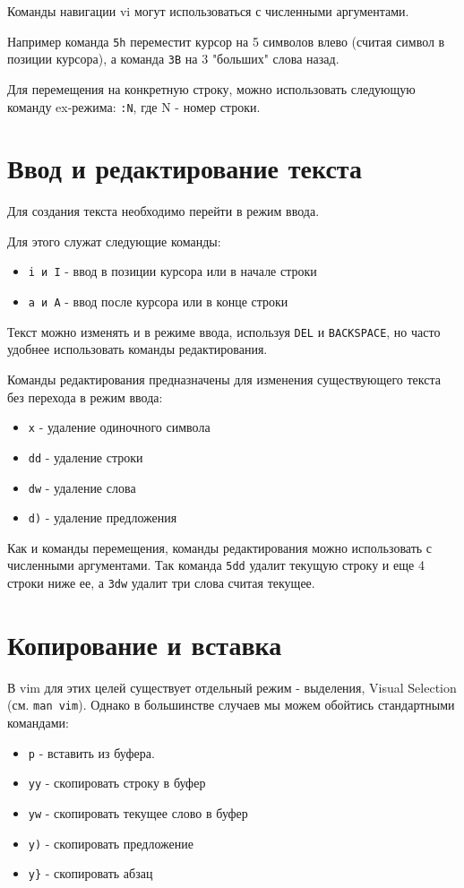 Команды навигации vi могут использоваться с численными аргументами.

Например команда \verb+5h+ переместит курсор на 5 символов влево (считая символ в позиции курсора), а команда \verb+3B+ на 3 "больших" слова назад. 

Для перемещения на конкретную строку, можно использовать следующую команду ex-режима: \verb+:N+, где N - номер строки.


\section{Ввод и редактирование текста}

Для создания текста необходимо перейти в режим ввода.

Для этого служат следующие команды:
\begin{itemize}
\item \verb+i и I+ - ввод в позиции курсора или в начале строки
\item \verb+a и A+ - ввод после курсора или в конце строки
\end{itemize}

Текст можно изменять и в режиме ввода, используя \verb+DEL+ и \verb+BACKSPACE+, но часто удобнее использовать команды редактирования.

Команды редактирования предназначены для изменения существующего текста без перехода в режим ввода:
\begin{itemize}
\item \verb+x+ - удаление одиночного символа
\item \verb+dd+ - удаление строки
\item \verb+dw+ - удаление слова
\item \verb+d)+ - удаление предложения
\end{itemize}

Как и команды перемещения, команды редактирования можно использовать с численными аргументами. Так команда \verb+5dd+ удалит текущую строку и еще 4 строки ниже ее, а \verb+3dw+ удалит три слова считая текущее.

\section{Копирование и вставка}

В vim для этих целей существует отдельный режим - выделения, Visual Selection (см. \verb+man vim+). Однако в большинстве случаев мы можем обойтись стандартными командами:
\begin{itemize}
\item \verb+p+ - вставить из буфера.
\item \verb+yy+ - скопировать строку в буфер
\item \verb+yw+ - скопировать текущее слово в буфер
\item \verb+y)+ - скопировать предложение
\item \verb+y}+ - скопировать абзац
\end{itemize}

